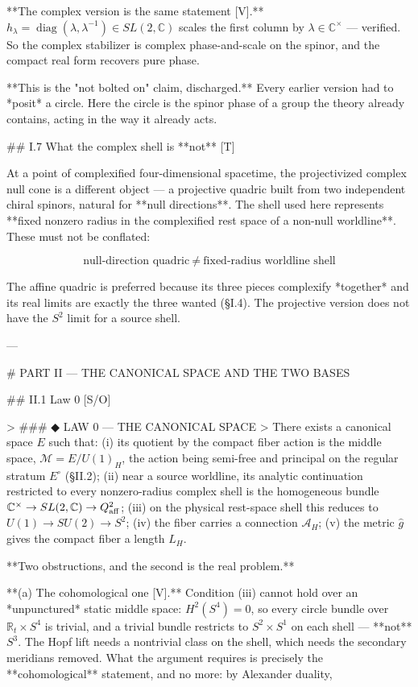 **The complex version is the same statement [V].** $h_\lambda = \operatorname{diag}(\lambda,\lambda^{-1})\in SL(2,\mathbb{C})$ scales the first column by $\lambda\in\mathbb{C}^\times$ — verified. So the complex stabilizer is complex phase-and-scale on the spinor, and the compact real form recovers pure phase.

**This is the "not bolted on" claim, discharged.** Every earlier version had to *posit* a circle. Here the circle is the spinor phase of a group the theory already contains, acting in the way it already acts.

## I.7 What the complex shell is **not** [T]

At a point of complexified four-dimensional spacetime, the projectivized complex null cone is a different object — a projective quadric built from two independent chiral spinors, natural for **null directions**. The shell used here represents **fixed nonzero radius in the complexified rest space of a non-null worldline**. These must not be conflated:

$$\text{null-direction quadric}\ \neq\ \text{fixed-radius worldline shell}$$

The affine quadric is preferred because its three pieces complexify *together* and its real limits are exactly the three wanted (§I.4). The projective version does not have the $S^2$ limit for a source shell.

---

# PART II — THE CANONICAL SPACE AND THE TWO BASES

## II.1 Law 0 [S/O]

> ### ◆ LAW 0 — THE CANONICAL SPACE
> There exists a canonical space $E$ such that: (i) its quotient by the compact fiber action is the middle space, $\mathcal{M} = E/U(1)_H$, the action being semi-free and principal on the regular stratum $E^\circ$ (§II.2); (ii) near a source worldline, its analytic continuation restricted to every nonzero-radius complex shell is the homogeneous bundle $\mathbb{C}^\times\to SL(2,\mathbb{C})\to Q^2_{\rm aff}$; (iii) on the physical rest-space shell this reduces to $U(1)\to SU(2)\to S^2$; (iv) the fiber carries a connection $\mathcal{A}_H$; (v) the metric $\hat g$ gives the compact fiber a length $L_H$.

**Two obstructions, and the second is the real problem.**

**(a) The cohomological one [V].** Condition (iii) cannot hold over an *unpunctured* static middle space: $H^2(S^4) = 0$, so every circle bundle over $\mathbb{R}_t\times S^4$ is trivial, and a trivial bundle restricts to $S^2\times S^1$ on each shell — **not** $S^3$. The Hopf lift needs a nontrivial class on the shell, which needs the secondary meridians removed. What the argument requires is precisely the **cohomological** statement, and no more: by Alexander duality,

